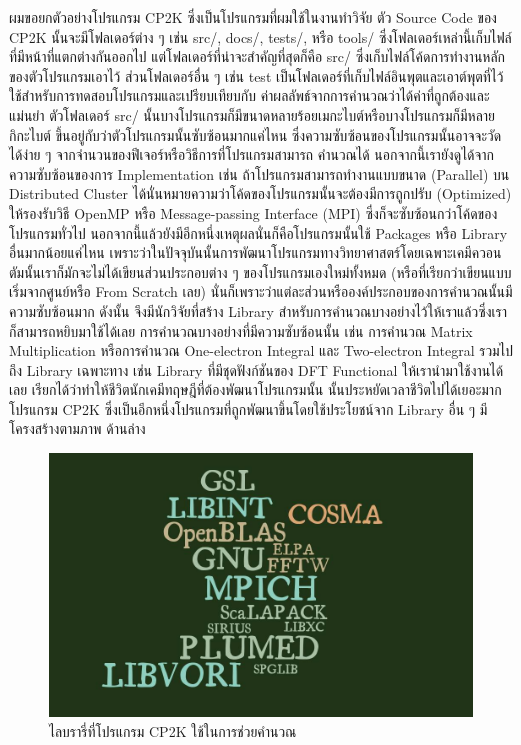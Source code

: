 ผมขอยกตัวอย่างโปรแกรม CP2K ซึ่งเป็นโปรแกรมที่ผมใช้ในงานทำวิจัย ตัว Source Code ของ CP2K นั้นจะมีโฟลเดอร์ต่าง ๆ เช่น src/, docs/,
tests/, หรือ tools/ ซึ่งโฟลเดอร์เหล่านี้เก็บไฟล์ที่มีหน้าที่แตกต่างกันออกไป แต่โฟลเดอร์ที่น่าจะสำคัญที่สุดก็คือ src/ ซึ่งเก็บไฟล์โค้ดการทำงานหลัก%
ของตัวโปรแกรมเอาไว้ ส่วนโฟลเดอร์อื่น ๆ เช่น test เป็นโฟลเดอร์ที่เก็บไฟล์อินพุตและเอาต์พุตที่ไว้ใช้สำหรับการทดสอบโปรแกรมและเปรียบเทียบกับ%
ค่าผลลัพธ์จากการคำนวณว่าได้ค่าที่ถูกต้องและแม่นยำ ตัวโฟลเดอร์ src/ นั้นบางโปรแกรมก็มีขนาดหลายร้อยเมกะไบต์หรือบางโปรแกรมก็มีหลายกิกะไบต์
ขึ้นอยู่กับว่าตัวโปรแกรมนั้นซับซ้อนมากแค่ไหน ซึ่งความซับซ้อนของโปรแกรมนั้นอาจจะวัดได้ง่าย ๆ จากจำนวนของฟีเจอร์หรือวิธีการที่โปรแกรมสามารถ%
คำนวณได้ นอกจากนี้เรายังดูได้จากความซับซ้อนของการ Implementation เช่น ถ้าโปรแกรมสามารถทำงานแบบขนาด (Parallel) บน Distributed
Cluster ได้นั่นหมายความว่าโค้ดของโปรแกรมนั้นจะต้องมีการถูกปรับ (Optimized) ให้รองรับวิธี OpenMP หรือ Message-passing Interface
(MPI) ซึ่งก็จะซับซ้อนกว่าโค้ดของโปรแกรมทั่วไป นอกจากนี้แล้วยังมีอีกหนึ่งเหตุผลนั่นก็คือโปรแกรมนั้นใช้ Packages หรือ Library อื่นมากน้อยแค่ไหน
เพราะว่าในปัจจุบันนั้นการพัฒนาโปรแกรมทางวิทยาศาสตร์โดยเฉพาะเคมีควอนตัมนั้นเราก็มักจะไม่ได้เขียนส่วนประกอบต่าง ๆ ของโปรแกรมเองใหม่ทั้งหมด
(หรือที่เรียกว่าเขียนแบบเริ่มจากศูนย์หรือ From Scratch เลย) นั่นก็เพราะว่าแต่ละส่วนหรือองค์ประกอบของการคำนวณนั้นมีความซับซ้อนมาก ดังนั้น%
จึงมีนักวิจัยที่สร้าง Library สำหรับการคำนวณบางอย่างไว้ให้เราแล้วซึ่งเราก็สามารถหยิบมาใช้ได้เลย การคำนวณบางอย่างที่มีความซับซ้อนนั้น เช่น
การคำนวณ Matrix Multiplication หรือการคำนวณ One-electron Integral และ Two-electron Integral รวมไปถึง Library
เฉพาะทาง เช่น Library ที่มีชุดฟังก์ชันของ DFT Functional ให้เรานำมาใช้งานได้เลย เรียกได้ว่าทำให้ชีวิตนักเคมีทฤษฎีที่ต้องพัฒนาโปรแกรมนั้น%
นั้นประหยัดเวลาชีวิตไปได้เยอะมาก โปรแกรม CP2K ซึ่งเป็นอีกหนึ่งโปรแกรมที่ถูกพัฒนาขึ้นโดยใช้ประโยชน์จาก Library อื่น ๆ มีโครงสร้างตามภาพ%
ด้านล่าง

\begin{figure}[htbp]
  \centering
  \includegraphics[width=0.7\linewidth]{fig/cp2k-lib.jpg}
  \caption{ไลบรารี่ที่โปรแกรม CP2K ใช้ในการช่วยคำนวณ}
  \label{fig:cp2k_lib}
\end{figure}

